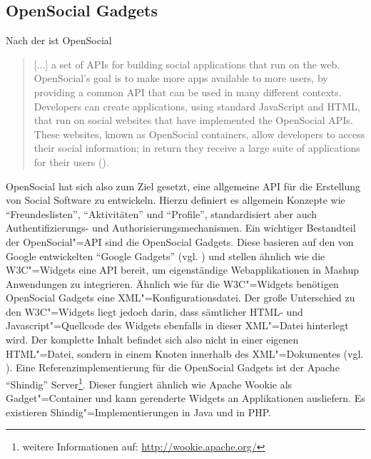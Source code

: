 \subsection{OpenSocial Gadgets}\label{section:opensocial_gadgets}
Nach der \cite{Opensocial2013} ist OpenSocial
\begin{quotation}
[...] a set of APIs for building social applications that run on the web. OpenSocial's goal is to make more apps available to more users, by providing a common API that can be used in many different contexts. Developers can create applications, using standard JavaScript and HTML, that run on social websites that have implemented the OpenSocial APIs. These websites, known as OpenSocial containers, allow developers to access their social information; in return they receive a large suite of applications for their users (\cite{Opensocial2013}).
\end{quotation}
OpenSocial hat sich also zum Ziel gesetzt, eine allgemeine \ac{API} für die Erstellung von Social Software zu entwickeln. Hierzu definiert es allgemein Konzepte wie "`Freundeslisten"', "`Aktivitäten"' und "`Profile"', standardisiert aber auch Authentifizierungs- und Authorisierungsmechanismen. Ein wichtiger Bestandteil der OpenSocial"=\ac{API} sind die OpenSocial Gadgets. Diese basieren auf den von Google entwickelten "`Google Gadgets"' (vgl. \cite{GoogleGadgetsApi2012}) und stellen ähnlich wie die \ac{W3C}"=Widgets eine API bereit, um eigenständige Webapplikationen in Mashup Anwendungen zu integrieren. Ähnlich wie für die \ac{W3C}"=Widgets benötigen OpenSocial Gadgets eine \ac{XML}"=Konfigurationsdatei. Der große Unterschied zu den \ac{W3C}"=Widgets liegt jedoch darin, dass sämtlicher \ac{HTML}- und Javascript"=Quellcode des Widgets ebenfalls in dieser \ac{XML}"=Datei hinterlegt wird. Der komplette Inhalt befindet sich also nicht in einer eigenen \ac{HTML}"=Datei, sondern in einem Knoten innerhalb des \ac{XML}"=Dokumentes (vgl. \cite{GoogleGadgetsApi2012}). Eine Referenzimplementierung für die OpenSocial Gadgets ist der Apache "`Shindig"' Server\footnote{weitere Informationen auf: \url{http://wookie.apache.org/}}. Dieser fungiert ähnlich wie Apache Wookie als Gadget"=Container und kann gerenderte Widgets an Applikationen ausliefern. Es existieren Shindig"=Implementierungen in Java und in PHP.

